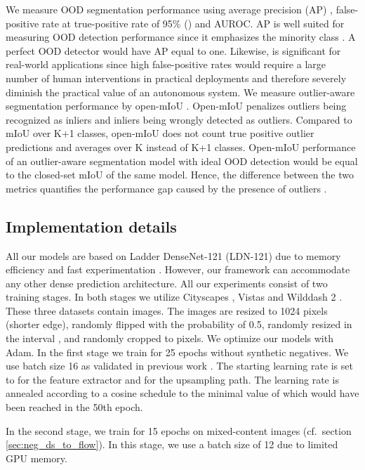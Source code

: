 \documentclass[lettersize,journal,hidelinks]{IEEEtran}
\begin{document}
We measure OOD segmentation performance using average precision (AP) \cite{everingham10ijcv}, false-positive rate at true-positive rate of 95\% () \cite{hendrycks17iclr} and AUROC.
AP is well suited for measuring OOD detection performance since it emphasizes the minority class \cite{davis06icml,blum21ijcv,chan21arxiv}.
A perfect OOD detector would have AP equal to one.
Likewise,  is significant for real-world applications since high false-positive rates would require a large number of human interventions in practical deployments and therefore severely diminish the practical value of an autonomous system.
We measure outlier-aware segmentation performance by open-mIoU \cite{grcic22eccv}.
Open-mIoU penalizes outliers being recognized as inliers and inliers being wrongly detected as outliers.
Compared to mIoU over K+1 classes, open-mIoU does not count true positive outlier predictions and averages over K instead of K+1 classes.
Open-mIoU performance of an outlier-aware segmentation model with ideal OOD detection would be equal to the closed-set mIoU of the same model.
Hence, the difference between the two metrics quantifies the performance gap caused by the presence of outliers \cite{grcic22eccv}.


\subsection{Implementation details}
\label{subsec:experimental-setup}
All our models are based on Ladder DenseNet-121 (LDN-121) 
due to memory efficiency and fast experimentation \cite{kreso21tits}.
However, our framework can accommodate any other dense prediction architecture.
All our experiments consist of two training stages.
In both stages we utilize Cityscapes \cite{cordts16cvpr}, Vistas \cite{neuhold17iccv} and Wilddash 2 \cite{zendel18eccv}.
These three datasets contain  images.
The images are resized to 1024 pixels (shorter edge), randomly flipped with the probability of 0.5, randomly resized in the interval , and randomly cropped to  pixels.
We optimize our models with Adam.
In the first stage we train for 25 epochs without synthetic negatives.
We use batch size 16 as validated in previous work \cite{kreso21tits}.
The starting learning rate is set to  for the feature extractor and  for the upsampling path.
The learning rate is annealed according to a cosine schedule to the minimal value of  which would have been reached in the 50th epoch.

In the second stage, we train for 15 epochs on mixed-content images (cf.\ section \ref{sec:neg_ds_to_flow}).
In this stage, we use a batch size of 12 due to limited GPU memory.
\end{document}
